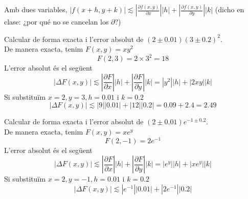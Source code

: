 \documentclass[../main.tex]{subfiles}
\begin{document}
    \begin{definicio}
        Amb dues variables, $|f(x+h, y+k)| \lesssim |\frac{\partial f(x,y)}{\partial x}||h| + |\frac{\partial f(x,y)}{\partial y}||k|$ (dicho en clase: ¿por qué no se cancelan los $\partial$?)
    \end{definicio}
    \begin{exercici}
        Calcular de forma exacta i l'error absolut de $(2\pm 0.01)(3\pm 0.2)^2$.\\
        De manera exacta, tenim $F(x,y) = xy^2$
        \begin{displaymath}
            F(2, 3) = 2\times3^2 = 18
        \end{displaymath}
        L'error absolut és el següent
        \begin{displaymath}
            |\Delta F(x,y)| \lesssim |\frac{\partial F}{\partial x}||h| +  |\frac{\partial F}{\partial y}||k| = |y^2||h| + |2xy||k|
        \end{displaymath}
        Si substituïm $x = 2, y = 3, h = 0.01$ i $k = 0.2$
        \begin{displaymath}
            |\Delta F(x,y)| \lesssim |9||0.01| + |12||0.2| = 0.09+2.4 = 2.49
        \end{displaymath}
    \end{exercici}
    \begin{exercici}
        Calcular de forma exacta i l'error absolut de $(2\pm 0.01)e^{-1\pm 0.2}$.\\
        De manera exacta, tenim $F(x,y) = xe^y$
        \begin{displaymath}
            F(2, -1) = 2e^{-1}
        \end{displaymath}
        L'error absolut és el següent
        \begin{displaymath}
            |\Delta F(x,y)| \lesssim |\frac{\partial F}{\partial x}||h| +  |\frac{\partial F}{\partial y}||k| = |e^y||h| + |xe^y||k|
        \end{displaymath}
        Si substituïm $x = 2, y = -1, h = 0.01$ i $k = 0.2$
        \begin{displaymath}
            |\Delta F(x,y)| \lesssim |e^{-1}||0.01| + |2e^{-1}||0.2|
        \end{displaymath}
    \end{exercici}
\end{document}
